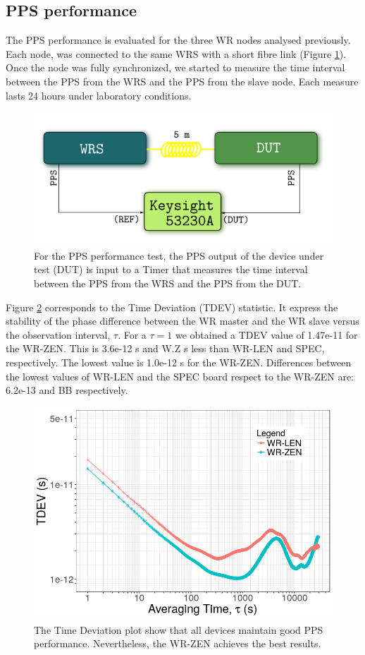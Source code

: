 \subsection{PPS performance}
\label{subsec:pps_performance}

The PPS performance is evaluated for the three WR nodes analysed previously. 
Each node, was connected to the same WRS with a short fibre link (Figure 
\ref{fig:prueba1pps}). Once the node was fully synchronized, we started to 
measure the time interval between the PPS from the WRS and the PPS from the 
slave node. Each measure lasts 24 hours under laboratory conditions.

\begin{figure}[H]
	\centering
	\includegraphics[width=0.7\linewidth]{img/prueba1_pps}
	\caption[Connection diagram for the PPS performance test.]{For the PPS 
	performance test, the PPS output of the device under test (DUT) is input to 
	a Timer that measures the time interval between the PPS from the WRS and 
	the PPS from the DUT.}
	\label{fig:prueba1pps}
\end{figure}

Figure \ref{fig:tdev_exp1} corresponds to the Time Deviation (TDEV) statistic. 
It express the stability of the phase difference between the WR master and the 
WR slave versus the observation interval, $\tau$. For a $\tau=1$ we obtained a 
TDEV value of 1.47e-11 for the WR-ZEN. This is 3.6e-12 s and W.Z s less than 
WR-LEN and SPEC, respectively. The lowest value is 1.0e-12 s for the WR-ZEN. 
Differences between the lowest values of WR-LEN and the SPEC board respect to 
the WR-ZEN are: 6.2e-13 and BB respectively.

\begin{figure}
    \centering
    \includegraphics[width=0.7\linewidth]{img/tdev_exp1}
    \caption[TDEV for the WR devices comparison.]{The Time Deviation plot show 
        that all devices maintain good PPS performance. Nevertheless, the 
        WR-ZEN 
        achieves the best results.}
    \label{fig:tdev_exp1}
\end{figure}

